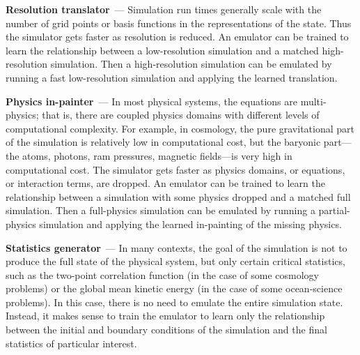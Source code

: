 \documentclass[10pt]{article}
\renewcommand{\paragraph}[1]{\smallskip\par\noindent\textbf{#1}~---}
\begin{document}
\begin{appendices}
\paragraph{Resolution translator}
Simulation run times generally scale with the number of grid points or basis functions in the representations of the state.
Thus the simulator gets faster as resolution is reduced.
An emulator can be trained to learn the relationship between a low-resolution simulation and a matched high-resolution simulation.
Then a high-resolution simulation can be emulated by running a fast low-resolution simulation and applying the learned translation.

\paragraph{Physics in-painter}
In most physical systems, the equations are multi-physics; that is, there are coupled physics domains with different levels of computational complexity.
For example, in cosmology, the pure gravitational part of the simulation is relatively low in computational cost, but the baryonic part---the atoms, photons, ram pressures, magnetic fields---is very high in computational cost.
The simulator gets faster as physics domains, or equations, or interaction terms, are dropped.
An emulator can be trained to learn the relationship between a simulation with some physics dropped and a matched full simulation.
Then a full-physics simulation can be emulated by running a partial-physics simulation and applying the learned in-painting of the missing physics.

\paragraph{Statistics generator}
In many contexts, the goal of the simulation is not to produce the full state of the physical system, but only certain critical statistics, such as the two-point correlation function (in the case of some cosmology problems) or the global mean kinetic energy (in the case of some ocean-science problems).
In this case, there is no need to emulate the entire simulation state.
Instead, it makes sense to train the emulator to learn only the relationship between the initial and boundary conditions of the simulation and the final statistics of particular interest.


\end{appendices}
\end{document}

